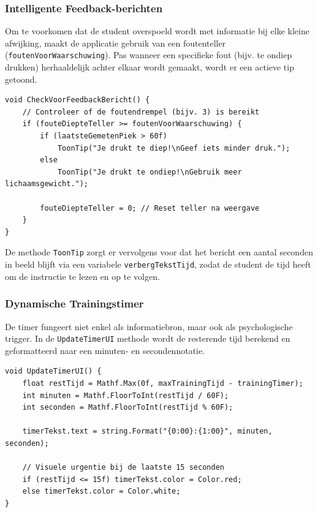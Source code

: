 \subsubsection{Intelligente Feedback-berichten}
Om te voorkomen dat de student overspoeld wordt met informatie bij elke kleine afwijking, maakt de applicatie gebruik van een 
foutenteller (\texttt{foutenVoorWaarschuwing}). Pas wanneer een specifieke fout (bijv. te ondiep drukken) herhaaldelijk achter elkaar wordt gemaakt, 
wordt er een actieve tip getoond.

\begin{listing}[htbp]
\begin{verbatim}
void CheckVoorFeedbackBericht() {
    // Controleer of de foutendrempel (bijv. 3) is bereikt
    if (fouteDiepteTeller >= foutenVoorWaarschuwing) {
        if (laatsteGemetenPiek > 60f) 
            ToonTip("Je drukt te diep!\nGeef iets minder druk.");
        else 
            ToonTip("Je drukt te ondiep!\nGebruik meer lichaamsgewicht.");
        
        fouteDiepteTeller = 0; // Reset teller na weergave
    }
}
\end{verbatim}
\caption{Logica voor het intelligent filteren en weergeven van corrigerende feedbackberichten op de HUD.}
\label{lst:hud_feedback_messages}
\end{listing}

De methode \texttt{ToonTip} zorgt er vervolgens voor dat het bericht een aantal seconden in beeld blijft via een variabele \texttt{verbergTekstTijd}, 
zodat de student de tijd heeft om de instructie te lezen en op te volgen.

\subsubsection{Dynamische Trainingstimer}
De timer fungeert niet enkel als informatiebron, maar ook als psychologische trigger. In de \texttt{UpdateTimerUI} methode wordt de resterende tijd 
berekend en geformatteerd naar een minuten- en secondennotatie.

\begin{listing}[htbp]
\begin{verbatim}
void UpdateTimerUI() {
    float restTijd = Mathf.Max(0f, maxTrainingTijd - trainingTimer);
    int minuten = Mathf.FloorToInt(restTijd / 60F);
    int seconden = Mathf.FloorToInt(restTijd % 60F);
    
    timerTekst.text = string.Format("{0:00}:{1:00}", minuten, seconden);
    
    // Visuele urgentie bij de laatste 15 seconden
    if (restTijd <= 15f) timerTekst.color = Color.red;
    else timerTekst.color = Color.white;
}
\end{verbatim}
\caption{Dynamische berekening, formattering en kleurcodering van de trainingstimer op de HUD.}
\label{lst:hud_timer_ui}
\end{listing}

